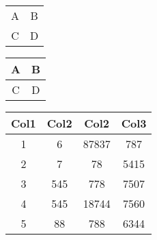 \documentclass{article}
\begin{document}
\begin{center}
    \begin{tabular}{|c|c|}
        A & B \\
        C & D
    \end{tabular}
\end{center}

\begin{center}
    \begin{tabular}{|c|c|}
        \hline
        A & B \\
        \hline
        C & D \\
        \hline
    \end{tabular}
\end{center}


\begin{center}
\begin{tabular}{||c c c c||} 
 \hline
 Col1 & Col2 & Col2 & Col3 \\ [0.5ex] 
 \hline\hline
 1 & 6 & 87837 & 787 \\ 
 \hline
 2 & 7 & 78 & 5415 \\
 \hline
 3 & 545 & 778 & 7507 \\
 \hline
 4 & 545 & 18744 & 7560 \\
 \hline
 5 & 88 & 788 & 6344 \\ [1ex] 
 \hline
\end{tabular}
\end{center}
\end{document}
